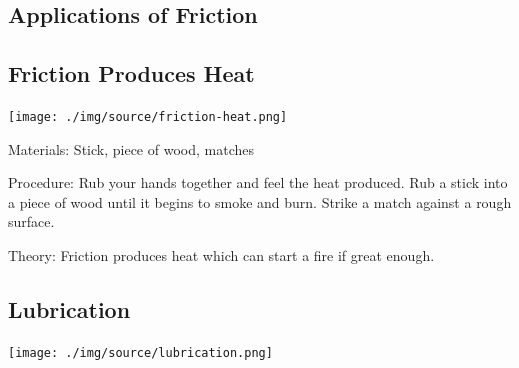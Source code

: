 \begin{multicols}{2}
\vfill
\columnbreak


\section*{Applications of Friction}


\subsection{Friction Produces Heat}

\begin{center}
\texttt{[image: ./img/source/friction-heat.png]}
\end{center}

\begin{description*}
\item[Materials:]{Stick, piece of wood, matches}
\item[Procedure:]{Rub your hands together and feel the heat produced. Rub a stick into a piece of wood until it begins to smoke and burn. Strike a match against a rough surface.}
\item[Theory:]{Friction produces heat which can start a fire if great enough.}
\end{description*}

\vfill
\columnbreak

\subsection{Lubrication}

\begin{center}
\texttt{[image: ./img/source/lubrication.png]}
\end{center}


\end{multicols}

